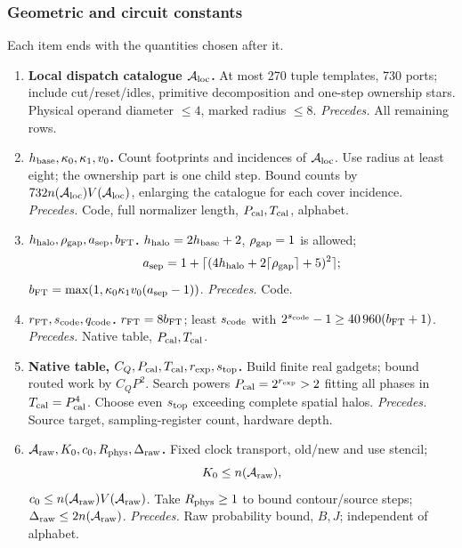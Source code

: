 \subsubsection{Geometric and circuit constants}\label{f4:order-a}
Each item ends with the quantities chosen after it.
\begin{enumerate}[label=\arabic*.,leftmargin=2em]
\item \textbf{\boldmath Local dispatch catalogue \(\mathcal A_{\rm loc}\).} At most 270 tuple templates,
730 ports; include cut/reset/idles, primitive decomposition and one-step
ownership stars. Physical operand diameter \(\le4\), marked radius \(\le8\).
\emph{Precedes.} All remaining rows.

\item \textbf{\boldmath\(h_{\rm base},\kappa_0,\kappa_1,v_0\).} Count footprints and incidences of
\(\mathcal A_{\rm loc}\). Use radius at least eight; the ownership part
is one child step. Bound counts by
\(732n(\mathcal A_{\rm loc})V(\mathcal A_{\rm loc})\), enlarging the
catalogue for each cover incidence.
\emph{Precedes.} Code, full normalizer length,
\(P_{\rm cal},T_{\rm cal}\), alphabet.

\item \textbf{\boldmath\(h_{\rm halo},\rho_{\rm gap},a_{\rm sep},b_{\rm FT}\).} \(h_{\rm halo}=2h_{\rm base}+2\),
\(\rho_{\rm gap}=1\) is allowed;
\[
 a_{\rm sep}=1+\lceil(4h_{\rm halo}+2\lceil\rho_{\rm gap}\rceil+5)^2\rceil;
\]
\(b_{\rm FT}=\max(1,\kappa_0\kappa_1v_0(a_{\rm sep}-1))\).
\emph{Precedes.} Code.

\item \textbf{\boldmath\(r_{\rm FT},s_{\rm code},q_{\rm code}\).}
\(r_{\rm FT}=8b_{\rm FT}\); least \(s_{\rm code}\) with
\(2^{s_{\rm code}}-1\ge40\,960(b_{\rm FT}+1)\).
\emph{Precedes.} Native table, \(P_{\rm cal},T_{\rm cal}\).

\item \textbf{Native table, \boldmath\(C_Q,P_{\rm cal},T_{\rm cal},r_{\rm exp},s_{\rm top}\).} Build finite real
gadgets; bound routed work by \(C_QP^2\). Search powers
\(P_{\rm cal}=2^{r_{\rm exp}}>2\) fitting all phases in \(T_{\rm cal}=P_{\rm cal}^4\). Choose
even \(s_{\rm top}\) exceeding complete spatial halos.
\emph{Precedes.} Source target,
sampling-register count, hardware depth.

\item \textbf{\boldmath\(\mathcal A_{\rm raw},K_0,c_0,R_{\rm phys},\Delta_{\rm raw}\).} Fixed
clock transport, old/new and use stencil; \[
 K_0\le n(\mathcal A_{\rm raw}),
\]
\(c_0\le n(\mathcal A_{\rm raw})V(\mathcal A_{\rm raw})\).
Take \(R_{\rm phys}\ge1\) to bound contour/source steps;
\mbox{\(\Delta_{\rm raw}\le2n(\mathcal A_{\rm raw})\)}.
\emph{Precedes.} Raw probability bound,
\(B,J\); independent of alphabet.


\end{enumerate}
